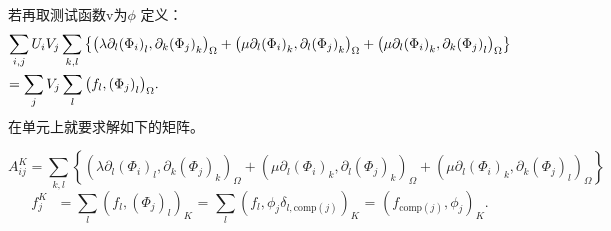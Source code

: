 若再取测试函数v为$\phi $
定义： 
	\[\begin{gathered}
  \sum\limits_{i,j} {{U_i}} {V_j}\sum\limits_{k,l} {\left\{ {{{\left( {\lambda {\partial _l}{{({\Phi _i})}_l},{\partial _k}{{({\Phi _j})}_k}} \right)}_\Omega } + {{\left( {\mu {\partial _l}{{({\Phi _i})}_k},{\partial _l}{{({\Phi _j})}_k}} \right)}_\Omega } + {{\left( {\mu {\partial _l}{{({\Phi _i})}_k},{\partial _k}{{({\Phi _j})}_l}} \right)}_\Omega }} \right\}}  \hfill \\
   = \sum\limits_j {{V_j}} \sum\limits_l {{{\left( {{f_l},{{({\Phi _j})}_l}} \right)}_\Omega }} . \hfill \\ 
\end{gathered} \]
在单元上就要求解如下的矩阵。

	\[A_{ij}^K = \sum\limits_{k,l} {\left\{ {{{\left( {\lambda {\partial _l}{{({\Phi _i})}_l},{\partial _k}{{({\Phi _j})}_k}} \right)}_\Omega } + {{\left( {\mu {\partial _l}{{({\Phi _i})}_k},{\partial _l}{{({\Phi _j})}_k}} \right)}_\Omega } + {{\left( {\mu {\partial _l}{{({\Phi _i})}_k},{\partial _k}{{({\Phi _j})}_l}} \right)}_\Omega }} \right\}} \]
	\[f_j^K{\text{ }} = \sum\limits_l {{{\left( {{f_l},{{({\Phi _j})}_l}} \right)}_K}} {\text{  = }}\sum\limits_l {{{\left( {{f_l},{\phi _j}{\delta _{l,{\text{comp}}(j)}}} \right)}_K}} {\text{  = }}{\left( {{f_{{\text{comp}}(j)}},{\phi _j}} \right)_K}.\]


